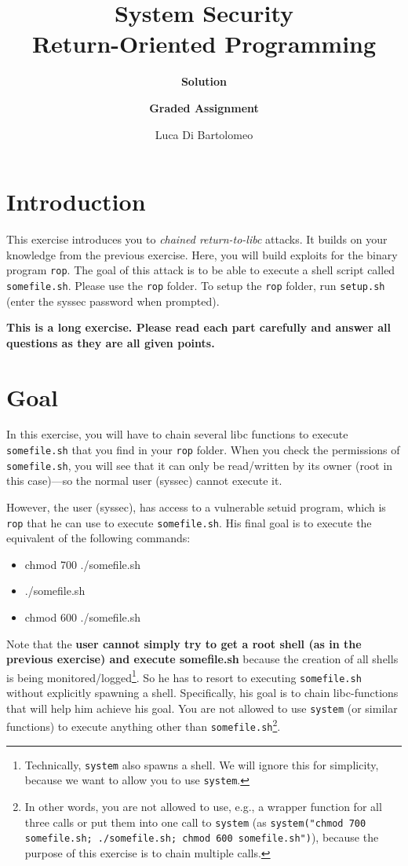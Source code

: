 \documentclass[a4paper,11pt]{article}
\title{System Security\\
Return-Oriented Programming}
\author{\bf Solution}
\author{\bf Graded Assignment}
\author{Luca Di Bartolomeo}
\begin{document}
\maketitle


\section*{Introduction}

This exercise introduces you to \textit{chained return-to-libc} attacks. It
builds on your knowledge from the previous exercise. Here, you will build
exploits for the binary program {\tt rop}.  The goal of this attack is to be
able to execute a shell script called {\tt somefile.sh}. Please use the
\texttt{rop} folder. To setup the \texttt{rop} folder, run
\texttt{setup.sh} (enter the syssec password when prompted).

\textbf{This is a long exercise. Please read each part carefully and answer all
questions as they are all given points.}


\section{Goal}

In this exercise, you will have to chain several libc functions
to execute \texttt{somefile.sh} that you find in your \texttt{rop} folder. 
When you check the permissions of \texttt{somefile.sh}, you will see that it
can only be read/written by its owner (root in this case)---so the normal user
(syssec) cannot execute it. 

However, the user (syssec), has access to a vulnerable setuid program, which is
\texttt{rop} that he can use to execute \texttt{somefile.sh}. His final goal is
to execute the equivalent of the following commands:

\begin{itemize}
\item chmod 700 ./somefile.sh
\item ./somefile.sh
\item chmod 600 ./somefile.sh
\end{itemize}

Note that the \textbf{user cannot simply try to get a root shell (as in the
previous exercise) and execute somefile.sh} because the creation of all shells
is being monitored/logged\footnote{Technically, \texttt{system} also spawns a
shell. We will ignore this for simplicity, because we want to allow you to use
\texttt{system}.}. So he has to resort to executing \texttt{somefile.sh} without
explicitly spawning a shell. Specifically, his goal is to chain
libc-functions that will help him achieve his goal. You are not allowed to use
\texttt{system} (or similar functions) to execute anything other than
\texttt{somefile.sh}\footnote{In other words, you are not allowed to use, e.g.,
a wrapper function for all three calls or put them into one call to
\texttt{system} (as \texttt{system("chmod 700 somefile.sh; ./somefile.sh; chmod
600 somefile.sh")}), because the purpose of this exercise is to chain multiple
calls.}.
\end{document}
